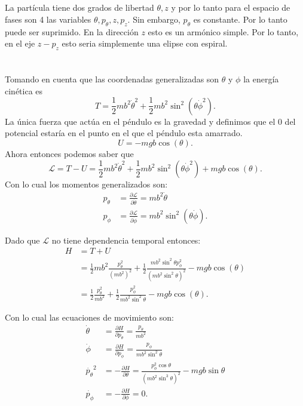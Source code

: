 \documentclass{report}
\newcommand{\Lag}{\mathcal{L}}
\begin{document}
\chapter{}

La partícula tiene dos grados de libertad $\theta, z$ y por lo tanto para el espacio de fases son 4 las variables $\theta, p_\theta, z, p_z$. Sin embargo, $p_\theta$ es constante. Por lo tanto puede ser suprimido. En la dirección $z$ esto es un armónico simple. Por lo tanto, en el eje $z-p_z$ esto seria simplemente una elipse con espiral.

\chapter{}

Tomando en cuenta que las coordenadas generalizadas son $\theta$ y $\phi$ la energía cinética es  \[
T = \frac{1}{2} mb^2\dot{\theta}^2 + \frac{1}{2}mb^2\sin^2\left( \theta \dot{\phi}^2 \right) 
.\] La única fuerza que actúa en el péndulo es la gravedad y definimos que el 0 del potencial estaría en el punto en el que el péndulo esta amarrado. \[
U = - mgb\cos\left( \theta \right) 
.\] Ahora entonces podemos saber que \[
\Lag = T - U = \frac{1}{2} mb^2\dot{\theta}^2 + \frac{1}{2}mb^2\sin^2\left( \theta \dot{\phi}^2 \right) + mgb\cos\left( \theta \right)
.\] Con lo cual los momentos generalizados son:
\begin{align*}
  p_\theta &= \frac{\partial \Lag}{\partial \dot{\theta}} = mb^2\dot{\theta}\\
  p_\phi &= \frac{\partial \Lag}{\partial \dot{\phi}} = mb^2\sin^2\left( \theta \dot{\phi} \right)
.\end{align*}

Dado que $\Lag$ no tiene dependencia temporal entonces:
\begin{align*}
  H &= T + U \\
    &= \frac{1}{2}mb^2 \frac{p_\theta^2}{\left( mb^2 \right)^2} + \frac{1}{2} \frac{mb^2\sin^2\theta p_\phi^2}{\left( mb^2\sin^2\theta \right)^2} - mgb\cos\left( \theta \right) \\
    &= \frac{1}{2} \frac{p_\theta^2}{mb^2} + \frac{1}{2} \frac{p_\phi^2}{mb^2\sin^2\theta} - mgb\cos\left( \theta \right)
.\end{align*}

Con lo cual las ecuaciones de movimiento son:
\begin{align*}
  \dot{\theta} &= \frac{\partial H}{\partial p_\theta} = \frac{p_\theta}{mb^2}\\
  \dot{\phi} &= \frac{\partial H}{\partial p_\phi} = \frac{p_\phi}{mb^2\sin^2\theta} \\
  \dot{p_\theta}^2 &= - \frac{\partial H}{\partial \theta} = \frac{p_\phi^2\cos\theta}{\left(   mb^2\sin^3\theta\right)^2} - mgb \sin\theta \\
  \dot{p_\phi} &= - \frac{\partial H}{\partial \phi} = 0
.\end{align*}
\end{document}
